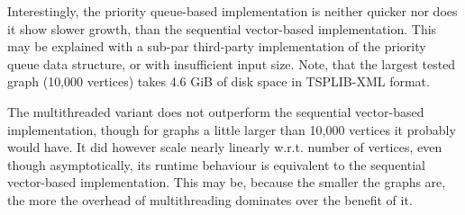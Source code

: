 Interestingly, the priority queue-based implementation is neither quicker
nor does it show slower growth, than the sequential vector-based implementation.
This may be explained with
a sub-par third-party implementation of the priority queue data structure,
or with insufficient input size. Note, that the largest tested graph (10,000 vertices)
takes 4.6 GiB of disk space in TSPLIB-XML format.

The multithreaded variant does not outperform the sequential vector-based implementation,
though for graphs a little larger than 10,000 vertices it probably would have.
It did however scale nearly linearly w.r.t. number of vertices,
even though asymptotically, its runtime behaviour is equivalent to the sequential vector-based implementation.
This may be, because the smaller the graphs are,
the more the overhead of multithreading dominates over
the benefit of it.
